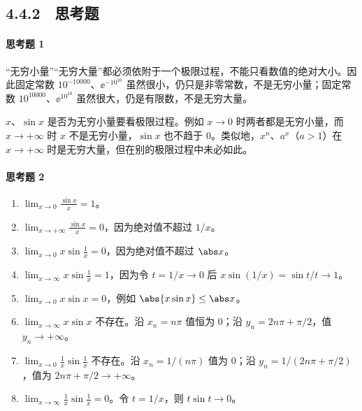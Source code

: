\subsection*{4.4.2　思考题}

\paragraph{思考题 1}
\begin{xsolution}
“无穷小量”“无穷大量”都必须依附于一个极限过程，不能只看数值的绝对大小。因此固定常数
$10^{-10000}$、$\ee^{-10^{10}}$ 虽然很小，仍只是非零常数，不是无穷小量；固定常数
$10^{10000}$、$\ee^{10^{10}}$ 虽然很大，仍是有限数，不是无穷大量。

$x$、$\sin x$ 是否为无穷小量要看极限过程。例如 $x\to0$ 时两者都是无穷小量，而 $x\to+\infty$ 时 $x$ 不是无穷小量，$\sin x$ 也不趋于 0。类似地，$x^n$、$a^x$（$a>1$）在 $x\to+\infty$ 时是无穷大量，但在别的极限过程中未必如此。
\end{xsolution}

\paragraph{思考题 2}
\begin{xsolution}
\begin{enumerate}[label=(\arabic*)]
  \item $\displaystyle\lim_{x\to0}\frac{\sin x}{x}=1$。
  \item $\displaystyle\lim_{x\to+\infty}\frac{\sin x}{x}=0$，因为绝对值不超过 $1/x$。
  \item $\displaystyle\lim_{x\to0}x\sin\frac1x=0$，因为绝对值不超过 $\abs x$。
  \item $\displaystyle\lim_{x\to\infty}x\sin\frac1x=1$，因为令 $t=1/x\to0$ 后
  $x\sin(1/x)=\sin t/t\to1$。
  \item $\displaystyle\lim_{x\to0}x\sin x=0$，例如 $\abs{x\sin x}\leq\abs x$。
  \item $\displaystyle\lim_{x\to\infty}x\sin x$ 不存在。沿 $x_n=n\pi$ 值恒为 0；沿
  $y_n=2n\pi+\pi/2$，值 $y_n\to+\infty$。
  \item $\displaystyle\lim_{x\to0}\frac1x\sin\frac1x$ 不存在。沿 $x_n=1/(n\pi)$ 值为 0；沿
  $y_n=1/(2n\pi+\pi/2)$，值为 $2n\pi+\pi/2\to+\infty$。
  \item $\displaystyle\lim_{x\to\infty}\frac1x\sin\frac1x=0$。令 $t=1/x$，则
  $t\sin t\to0$。
\end{enumerate}
\end{xsolution}

